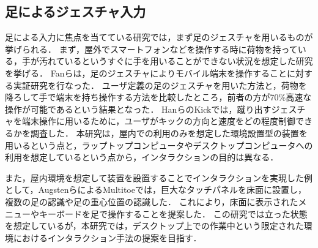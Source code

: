 \documentclass[submit, techrep]{ipsj}
\begin{document}
\subsection{足によるジェスチャ入力}
足による入力に焦点を当てている研究では，まず足のジェスチャを用いるものが挙げられる．
まず，屋外でスマートフォンなどを操作する時に荷物を持っている，手が汚れているというすぐに手を用いることができない状況を想定した研究を挙げる．
Fanら\cite{Fan:2017:ESF:3123021.3123043}は，足のジェスチャによりモバイル端末を操作することに対する実証研究を行なった．
ユーザ定義の足のジェスチャを用いた方法と，荷物を降ろして手で端末を持ち操作する方法を比較したところ，前者の方が70\%高速な操作が可能であるという結果となった．
HanらのKick\cite{Han:2011:KIU:2037373.2037379}では，蹴り出すジェスチャを端末操作に用いるために，ユーザがキックの方向と速度をどの程度制御できるかを調査した．
本研究は，屋内での利用のみを想定した環境設置型の装置を用いるという点と，ラップトップコンピュータやデスクトップコンピュータへの利用を想定しているという点から，インタラクションの目的は異なる．\par
また，屋内環境を想定して装置を設置することでインタラクションを実現した例として，AugstenらによるMultitoe\cite{Augsten:2010:MHI:1866029.1866064}では，巨大なタッチパネルを床面に設置し，複数の足の認識や足の重心位置の認識した．
これにより，床面に表示されたメニューやキーボードを足で操作することを提案した．
この研究では立った状態を想定しているが，本研究では，デスクトップ上での作業中という限定された環境におけるインタラクション手法の提案を目指す．
\end{document}
